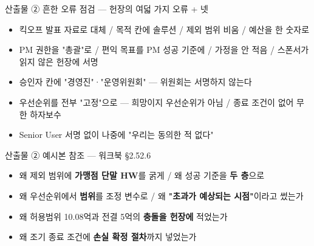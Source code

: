 \begin{frame}{산출물 ② 흔한 오류 점검 — 헌장의 여덟 가지 오류 + 넷}
\begin{itemize}
\item 킥오프 발표 자료로 대체 / 목적 칸에 솔루션 / 제외 범위 비움 / 예산을 한 숫자로
\item PM 권한을 "총괄"로 / 편익 목표를 PM 성공 기준에 / 가정을 안 적음 / 스폰서가 읽지 않은 헌장에 서명
\item 승인자 칸에 "경영진"·"운영위원회" — 위원회는 서명하지 않는다
\item 우선순위를 전부 "고정"으로 — 희망이지 우선순위가 아님 / 종료 조건이 없어 무한 하자보수
\item Senior User 서명 없이 나중에 "우리는 동의한 적 없다"
\end{itemize}
\end{frame}

\begin{frame}{산출물 ② 예시본 참조 — 워크북 §2.5\til{}2.6}
\begin{itemize}
\item 왜 제외 범위에 \textbf{가맹점 단말 HW}를 굵게 / 왜 성공 기준을 \textbf{두 층}으로
\item 왜 우선순위에서 \textbf{범위}를 조정 변수로 / 왜 \textbf{"초과가 예상되는 시점"}이라고 썼는가
\item 왜 허용범위 10.08억과 전결 5억의 \textbf{충돌을 헌장에} 적었는가
\item 왜 조기 종료 조건에 \textbf{손실 확정 절차}까지 넣었는가
\end{itemize}
\end{frame}

